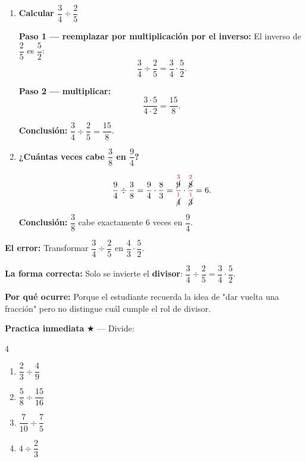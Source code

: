 \documentclass[11pt, letterpaper]{article}
\begin{document}
\begin{tcolorbox}[examplebox, title={Ejemplos --- Divisi\'on de fracciones}]
\begin{enumerate}[label=\textbf{Ej. \arabic*.}, leftmargin=*, itemsep=14pt]

\item \textbf{Calcular $\dfrac{3}{4}\div\dfrac{2}{5}$}

\textbf{Paso 1 --- reemplazar por multiplicaci\'on por el inverso:}
El inverso de $\dfrac{2}{5}$ es $\dfrac{5}{2}$:
$$\frac{3}{4}\div\frac{2}{5}=\frac{3}{4}\cdot\frac{5}{2}.$$

\medskip
\textbf{Paso 2 --- multiplicar:}
$$\frac{3\cdot5}{4\cdot2}=\frac{15}{8}.$$

\medskip
\textbf{Conclusi\'on:} $\dfrac{3}{4}\div\dfrac{2}{5}=\dfrac{15}{8}$.

\item \textbf{¿Cu\'antas veces cabe $\dfrac{3}{8}$ en $\dfrac{9}{4}$?}

$$\frac{9}{4}\div\frac{3}{8}=\frac{9}{4}\cdot\frac{8}{3}=\frac{\overset{\textcolor{red}{3}}{\cancel{9}}}{\overset{\textcolor{red}{1}}{\cancel{4}}}\cdot\frac{\overset{\textcolor{red}{2}}{\cancel{8}}}{\overset{\textcolor{red}{1}}{\cancel{3}}}=6.$$

\medskip
\textbf{Conclusi\'on:} $\dfrac{3}{8}$ cabe exactamente $6$ veces en $\dfrac{9}{4}$.

\end{enumerate}
\end{tcolorbox}

\begin{tcolorbox}[warningbox, title={Error frecuente --- Invertir ambas fracciones}]
\noindent\textbf{El error:}
Transformar $\dfrac{3}{4}\div\dfrac{2}{5}$ en $\dfrac{4}{3}\cdot\dfrac{5}{2}$.

\medskip
\noindent\textbf{La forma correcta:}
Solo se invierte el \textbf{divisor}: $\dfrac{3}{4}\div\dfrac{2}{5}=\dfrac{3}{4}\cdot\dfrac{5}{2}$.

\medskip
\noindent\textbf{Por qu\'e ocurre:}
Porque el estudiante recuerda la idea de "dar vuelta una fracci\'on" pero no distingue cu\'al cumple el rol de divisor.
\end{tcolorbox}

\medskip
\textbf{Practica inmediata} \quad $\bigstar$ --- Divide:
\begin{multicols}{4}
\begin{enumerate}[label=\alph*), leftmargin=*]
  \item $\dfrac{2}{3}\div\dfrac{4}{9}$ \item $\dfrac{5}{8}\div\dfrac{15}{16}$
  \item $\dfrac{7}{10}\div\dfrac{7}{5}$ \item $4\div\dfrac{2}{3}$
\end{enumerate}
\end{multicols}
\end{document}
